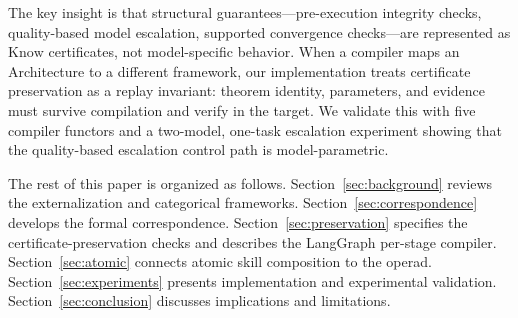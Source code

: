 The key insight is that structural guarantees---pre-execution integrity checks, quality-based model escalation, supported convergence checks---are represented as $\mathrm{Know}$ certificates, not model-specific behavior. When a compiler maps an Architecture to a different framework, our implementation treats certificate preservation as a replay invariant: theorem identity, parameters, and evidence must survive compilation and verify in the target. We validate this with five compiler functors and a two-model, one-task escalation experiment showing that the quality-based escalation control path is model-parametric.

The rest of this paper is organized as follows. Section~\ref{sec:background} reviews the externalization and categorical frameworks. Section~\ref{sec:correspondence} develops the formal correspondence. Section~\ref{sec:preservation} specifies the certificate-preservation checks and describes the LangGraph per-stage compiler. Section~\ref{sec:atomic} connects atomic skill composition to the operad. Section~\ref{sec:experiments} presents implementation and experimental validation. Section~\ref{sec:conclusion} discusses implications and limitations.
